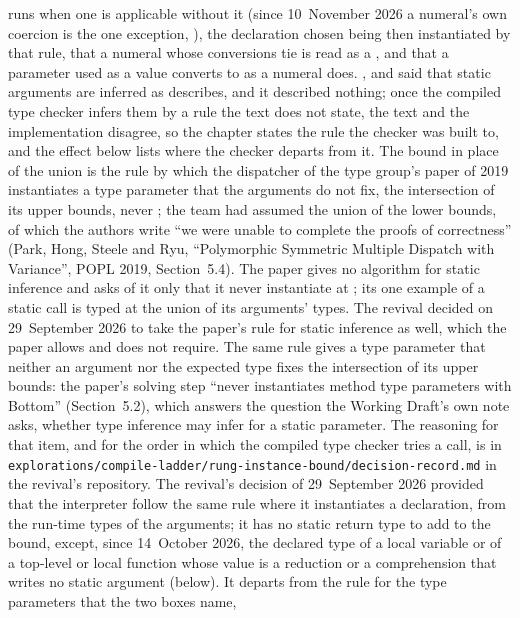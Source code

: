 \begin{description}
runs when one is applicable without it (since 10~November 2026 a numeral's own
coercion is the one exception, ), the declaration
chosen being then
instantiated by that rule, that a numeral whose conversions tie is read as a
, and that a  parameter used as a value converts to
 as a numeral does.
,  and 
said that static arguments are inferred as  describes,
and it described nothing; once the compiled type checker infers them by a rule
the text does not state, the text and the implementation disagree, so the
chapter states the rule the checker was built to, and the effect below lists
where the checker departs from it.
The bound in place of the union is the rule by which the dispatcher of the type
group's paper of 2019 instantiates a type parameter that the arguments do not
fix, the intersection of its upper bounds, never ; the team
had assumed the union of the lower bounds, of which the authors write ``we were
unable to complete the proofs of correctness'' (Park, Hong, Steele and Ryu,
``Polymorphic Symmetric Multiple Dispatch with Variance'', POPL 2019,
Section~5.4).
The paper gives no algorithm for static inference and asks of it only that it
never instantiate at ; its one example of a static call is
typed at the union of its arguments' types.
The revival decided on 29~September 2026 to take the paper's rule for static
inference as well, which the paper allows and does not require.
The same rule gives a type parameter that neither an argument nor the expected
type fixes the intersection of its upper bounds: the paper's solving step
``never instantiates method type parameters with Bottom'' (Section~5.2), which
answers the question the Working Draft's own note asks, whether type inference
may infer  for a static parameter.
The reasoning for that item, and for the order in which the compiled type
checker tries a call, is in
\nolinkurl{explorations/compile-ladder/rung-instance-bound/decision-record.md}
in the revival's repository.
The revival's decision of 29~September 2026 provided that the interpreter
follow the same rule where it instantiates a declaration, from the run-time
types of the arguments; it has no static return type to add to the bound,
except, since 14~October 2026, the declared type of a local variable or of a
top-level or local function whose value is a reduction or a comprehension that
writes no static argument (below).
It departs from the rule for the type parameters that the two boxes name,

\end{description}

